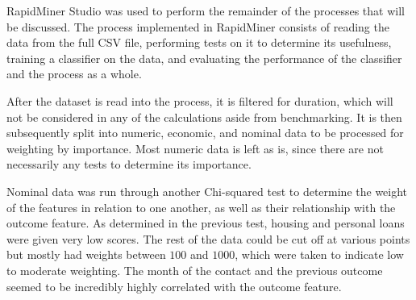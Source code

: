 \documentclass[prodmode]{acmsmall} %
\begin{document}
\begin{figure}[!t]
\end{figure}

RapidMiner Studio was used to perform the remainder of the processes that will
be discussed. The process implemented in RapidMiner consists of reading the data
from the full CSV file, performing tests on it to determine its usefulness,
training a classifier on the data, and evaluating the performance of the
classifier and the process as a whole.

After the dataset is read into the process, it is filtered for duration, which
will not be considered in any of the calculations aside from benchmarking. It is
then subsequently split into numeric, economic, and nominal data to be processed
for weighting by importance. Most numeric data is left as is, since there are
not necessarily any tests to determine its importance.

Nominal data was run through another Chi-squared test to determine the weight of
the features in relation to one another, as well as their relationship with the
outcome feature. As determined in the previous test, housing and personal loans
were given very low scores. The rest of the data could be cut off at various
points but mostly had weights between $100$ and $1000$, which were taken to
indicate low to moderate weighting. The month of the contact and the previous
outcome seemed to be incredibly highly correlated with the outcome feature.
 
\end{document}
